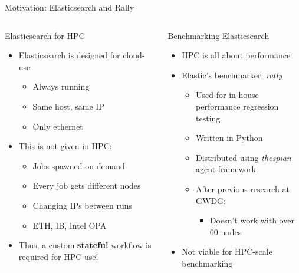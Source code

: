 \documentclass[compress,aspectratio=169]{beamer}
\begin{document}
  \begin{frame}{Motivation: Elasticsearch and Rally}
    \begin{columns}
      \begin{column}{0.5\textwidth}
        \begin{block}{Elasticsearch for HPC}
          \begin{itemize}
            \item Elasticsearch is designed for cloud-use
              \begin{itemize}
                \item Always running
                \item Same host, same IP
                \item Only ethernet
              \end{itemize}
            \item This is not given in HPC:
              \begin{itemize}
                \item Jobs spawned on demand
                \item Every job gets different nodes
                \item Changing IPs between runs
                \item ETH, IB, Intel OPA
              \end{itemize}
            \item Thus, a custom \textbf{stateful} workflow is required for HPC use!
          \end{itemize}
        \end{block}
      \end{column}
      \pause
      \begin{column}{0.5\textwidth}
        \begin{block}{Benchmarking Elasticsearch}
          \begin{itemize}
            \item HPC is all about performance
            \item Elastic's benchmarker: \emph{rally}
              \begin{itemize}
                \item Used for in-house performance regression testing
                \item Written in Python
                \item Distributed using \emph{thespian} agent framework
                \item After previous research at GWDG: 
                  \begin{itemize}
                    \item Doesn't work with over 60 nodes
                  \end{itemize}
              \end{itemize}
              \item Not viable for HPC-scale benchmarking
          \end{itemize}
        \end{block}
      \end{column}
    \end{columns}
  \end{frame}
  
\end{document}
